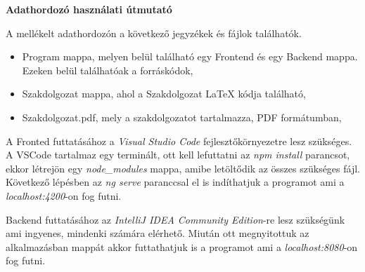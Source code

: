 \pagestyle{empty}

\noindent \textbf{\Large Adathordozó használati útmutató}

\vskip 1cm


A mellékelt adathordozón a következő jegyzékek és fájlok találhatók.

\begin{itemize}
\item Program mappa, melyen belül található egy Frontend és egy Backend mappa. Ezeken belül találhatóak a forráskódok,
\item Szakdolgozat mappa, ahol a Szakdolgozat LaTeX kódja található,
\item Szakdolgozat.pdf, mely a szakdolgozatot tartalmazza, PDF formátumban,
\end{itemize}

A Fronted futtatásához a \textit{Visual Studio Code} fejlesztőkörnyezetre lesz szükséges. A VSCode tartalmaz egy terminált, ott kell lefuttatni az \textit{npm install} parancsot, ekkor létrejön egy \textit{node\_modules} mappa, amibe letöltődik az összes szükséges fájl. Következő lépésben az \textit{ng serve} paranccsal el is indíthatjuk a programot ami a \textit{localhost:4200}-on fog futni.

Backend futtatásához az \textit{IntelliJ IDEA Community Edition}-re lesz szükségünk ami ingyenes, mindenki számára elérhető. Miután ott megnyitottuk az alkalmazásban mappát akkor futtathatjuk is a programot ami a \textit{localhost:8080}-on fog futni.